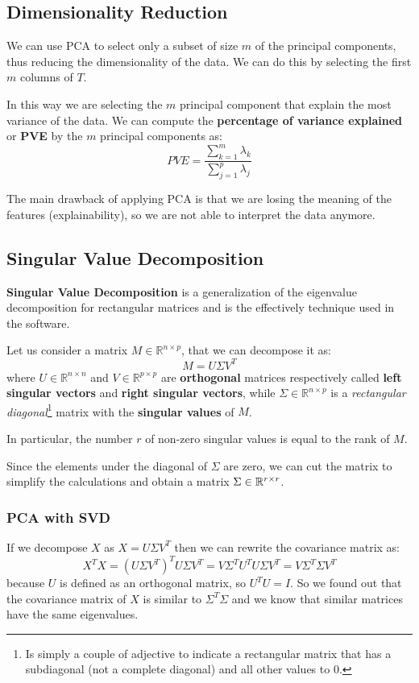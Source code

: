 \subsection{Dimensionality Reduction}
We can use PCA to select only a subset of size $m$ of the principal components, thus reducing the dimensionality of the data. We can do this by selecting the first $m$ columns of $T$.

In this way we are selecting the $m$ principal component that explain the most variance of the data. We can compute the \textbf{percentage of variance explained} or \textbf{PVE} by the $m$ principal components as:
\[
    PVE = \frac{\sum_{k=1}^m \lambda_k}{\sum_{j=1}^p \lambda_j}
\]

The main drawback of applying PCA is that we are losing the meaning of the features (explainability), so we are not able to interpret the data anymore.

\subsection{Singular Value Decomposition}
\textbf{Singular Value Decomposition} is a generalization of the eigenvalue decomposition for rectangular matrices and is the effectively technique used in the software. 

Let us consider a matrix $M \in \mathbb{R}^{n \times p}$, that we can decompose it as:
\[
    M = U \Sigma V^T
\]
where $U \in \mathbb{R}^{n \times n}$ and $V \in \mathbb{R}^{p \times p}$ are \textbf{orthogonal} matrices respectively called \textbf{left singular vectors} and \textbf{right singular vectors}, while $\Sigma \in \mathbb{R}^{n \times p}$ is a \textit{rectangular diagonal}\footnote{Is simply a couple of adjective to indicate a rectangular matrix that has a subdiagonal (not a complete diagonal) and all other values to $0$.} matrix with the \textbf{singular values} of $M$. 

In particular, the number $r$ of non-zero singular values is equal to the rank of $M$.

Since the elements under the diagonal of $\Sigma$ are zero, we can cut the matrix to simplify the calculations and obtain a matrix $\Sigma\in \mathbb{R}^{r\times r}$.

\subsubsection*{PCA with SVD}
If we decompose $X$ as $X = U \Sigma V^T$ then we can rewrite the covariance matrix as:
\[
    X^T X = (U \Sigma V^T)^T U \Sigma V^T = V \Sigma^T U^T U \Sigma V^T = V \Sigma^T \Sigma V^T
\]
because $U$ is defined as an orthogonal matrix, so $U^T U = I$.
So we found out that the covariance matrix of $X$ is similar to $\Sigma^T \Sigma$ and we know that similar matrices have the same eigenvalues.

